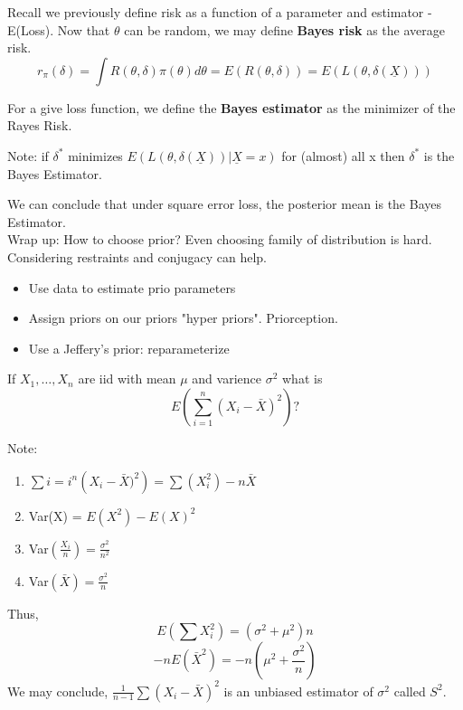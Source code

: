 \documentclass[11pt,fleqn]{book} %
\begin{document}
	\begin{definition}
		Recall we previously define risk as a function of a parameter and estimator - E(Loss). Now that $\theta$ can be random, we may define \textbf{Bayes risk} as the average risk.
		$$r_\pi(\delta) = \int R(\theta,\delta)\pi(\theta) d\theta = E(R(\theta,\delta)) = E(L(\theta,\delta(\underline{X}))) $$
	\end{definition}

	\begin{definition}
		For a give loss function, we define the \textbf{Bayes estimator} as the minimizer of the Rayes Risk. 
	\end{definition}
	Note: if $\delta^*$ minimizes $E(L(\theta,\delta(\underline{X}))|\underline{X}=x)$ for (almost) all x then $\delta^*$ is the Bayes Estimator. 

	We can conclude that under square error loss, the posterior mean is the Bayes Estimator.\\
	Wrap up: How to choose prior? Even choosing family of distribution is hard. Considering restraints and conjugacy can help.
	\begin{itemize}
		\item Use data to estimate prio parameters
		\item Assign priors on our priors "hyper priors". Priorception.
		\item Use a Jeffery's prior: reparameterize
	\end{itemize}

	\begin{exercise}
	If $X_1, \dots, X_n$ are iid with mean $\mu$ and varience $\sigma^2$ what is
	$$
	E \left(\sum_{i=1}^n (X_i-\bar{X})^2 \right)?
	$$

	Note:
	\begin{enumerate}
			\item $\sum{i=i}^n \left (X_i - \bar{X})^2 \right) = \sum (X_i^2) - n\bar{X}$
			\item Var(X) = $E(X^2)-E(X)^2$
			\item Var$(\frac{X_i}{n})=\frac{\sigma^2}{n^2}$
			\item Var$(\bar{X})=\frac{\sigma^2}{n}$
		\end{enumerate}	

	Thus,
	$$E (\sum X_i^2) = (\sigma^2 + \mu^2)n$$
	$$-n E(\bar{X}^2)= -n(\mu^2+\frac{\sigma^2}{n}) $$
	We may conclude, $\frac{1}{n-1}\sum(X_i-\bar{X})^2$ is an unbiased estimator of $\sigma^2$ called $S^2$. 
	\end{exercise}
\end{document}
